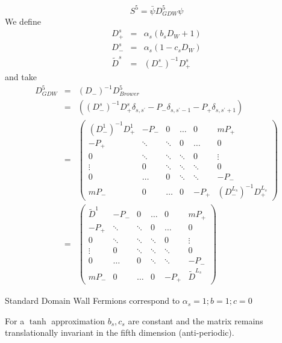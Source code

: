 \documentclass[letter,10pt]{report}
\begin{document}
\begin{equation}
S^5 = \bar{\psi} D^5_{GDW} \psi
\end{equation}
We define
\begin{eqnarray}
D^s_+ &=& \alpha_s (b_s  D_W + 1)\\
D^s_- &=& \alpha_s (1-c_s  D_W )\\
\tilde{D}^s &=& (D^s_-)^{-1} D^s_+
\end{eqnarray}
and take
\begin{eqnarray}
D^5_{GDW}
 &= &  (D_-)^{-1} D^5_{Brower}\\
 &= & 
 \left( 
         (D_-^{s})^{-1} D^{s}_+ \delta_{s,s^\prime}
 -  P_- \delta_{s,s^\prime-1}
 -  P_+ \delta_{s,s^\prime+1} 
\right) \\
&=&
\left(
\begin{array}{cccccc}
  (D^1_- )^{-1}D^1_+ & - P_- & 0& \ldots & 0 &  m P_+ \\
-  P_+  & \ddots &  \ddots & 0      & \ldots &0 \\
0     & \ddots &  \ddots & \ddots & 0      &\vdots \\
\vdots& 0      &  \ddots & \ddots & \ddots & 0\\
0     & \ldots &    0    &  \ddots& \ddots & - P_- \\
m P_- & 0      & \ldots  &  0     &   - P_+   
& (D^{L_s}_- )^{-1}D^{L_s}_+
\end{array}
\right)\\
&=&
\left(
\begin{array}{cccccc}
  \tilde{D}^{1} & - P_- & 0& \ldots & 0 &  m P_+ \\
-  P_+  & \ddots &  \ddots & 0      & \ldots &0 \\
0     & \ddots &  \ddots & \ddots & 0      &\vdots \\
\vdots& 0      &  \ddots & \ddots & \ddots & 0\\
0     & \ldots &    0    &  \ddots& \ddots & - P_- \\
m P_- & 0      & \ldots  &  0     &   - P_+   
& \tilde{D}^{L_s}
\end{array}
\right)
\end{eqnarray}

Standard Domain Wall Fermions correspond to $\alpha_s=1 ; b=1 ; c=0$ 

For a $\tanh$ approximation $b_s, c_s$ are constant and the matrix remains
translationally invariant in the fifth dimension (anti-periodic).
\end{document}
